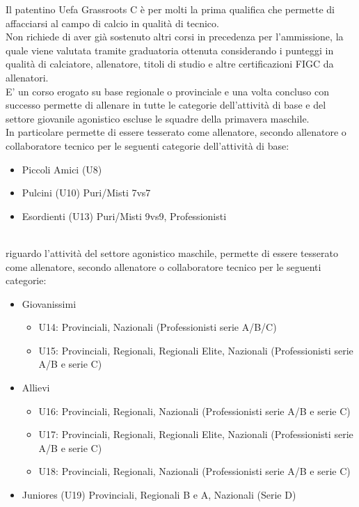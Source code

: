 \documentclass[../uefaC.tex]{subfiles}
\begin{document}
Il patentino Uefa Grassroots C è per molti la prima qualifica che permette di affacciarsi al campo di calcio in qualità di tecnico. \hfill \\
Non richiede di aver già sostenuto altri corsi in precedenza per l'ammissione, la quale viene valutata tramite graduatoria ottenuta considerando i punteggi in qualità di calciatore, allenatore, titoli di studio e altre certificazioni FIGC da allenatori.
\hfill \\
E' un corso erogato su base regionale o provinciale e una volta concluso con successo permette di allenare in tutte le categorie dell'attività di base e del settore giovanile agonistico escluse le squadre della primavera maschile.
\hfill \\
In particolare permette di essere tesserato come allenatore, secondo allenatore o collaboratore tecnico per le seguenti categorie dell'attività di base:
\begin{itemize}
    \item Piccoli Amici (U8)
    \item Pulcini (U10) Puri/Misti 7vs7
    \item Esordienti (U13) Puri/Misti 9vs9, Professionisti
\end{itemize}
\hfill \\
riguardo l'attività del settore agonistico maschile, permette di essere tesserato come allenatore, secondo allenatore o collaboratore tecnico per le seguenti categorie:
\begin{itemize}
\item Giovanissimi
    \begin{itemize}
        \item U14: Provinciali, Nazionali (Professionisti serie A/B/C)
        \item U15: Provinciali, Regionali, Regionali Elite, Nazionali (Professionisti serie A/B e serie C)
    \end{itemize}
\item Allievi 
    \begin{itemize}
        \item U16: Provinciali, Regionali, Nazionali (Professionisti serie A/B e serie C)
        \item U17: Provinciali, Regionali, Regionali Elite, Nazionali (Professionisti serie A/B e serie C)
        \item U18: Provinciali, Regionali, Nazionali (Professionisti serie A/B e serie C)
    \end{itemize}
\item Juniores (U19) Provinciali, Regionali B e A, Nazionali (Serie D)
\end{itemize}
\end{document}
